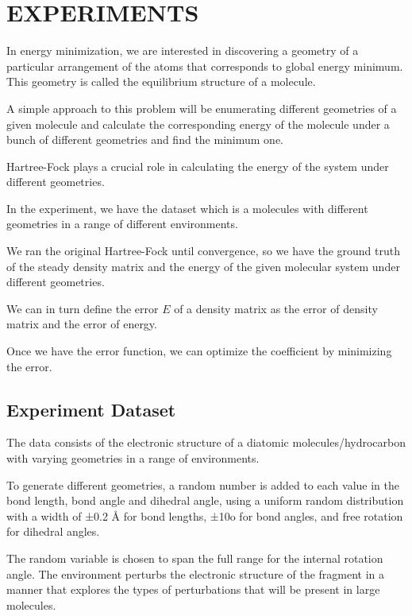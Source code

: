 \documentclass[twoside]{article}
\begin{document}
\section{EXPERIMENTS}

In energy minimization, we are interested in discovering a geometry of a particular arrangement of the atoms that corresponds to global energy minimum. This geometry is called the equilibrium structure of a molecule.

A simple approach to this problem will be enumerating different geometries of a given molecule and calculate the corresponding energy of the molecule under a bunch of different geometries and find the minimum one.


Hartree-Fock plays a crucial role in calculating the energy of the system under different geometries. 

In the experiment, we have the dataset which is 
 a molecules with different geometries in a range of different environments. 
 
We ran the original Hartree-Fock until convergence, so we have the ground truth of the steady density matrix and the energy of the given molecular system under different geometries. 

We can in turn define the error $E$ of a density matrix as the error of density matrix and the error of energy.

Once we have the error function, we can optimize the coefficient by minimizing the error.
 
 
\subsection{Experiment Dataset}

The data consists of the electronic structure of a diatomic molecules/hydrocarbon with varying geometries in a range of environments. 

To generate different geometries,
a random number is added to each value in the bond length, bond angle and dihedral angle, using a uniform random distribution with a width of ±0.2 Å for bond lengths, ±10o for bond angles, and free rotation for dihedral angles. 

The random variable is chosen to span the full range for the internal rotation angle. The environment perturbs the electronic structure of the fragment in a manner that explores the types of perturbations that will be present in large molecules. 
\end{document}
